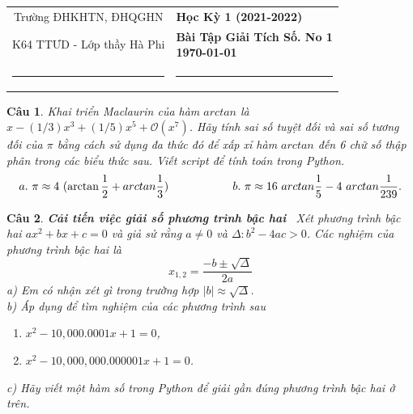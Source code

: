 \documentclass[answers]{exam}
\newtheorem{bt}{Câu}
\begin{document}
\begin{tabular*}
	{\linewidth}{c>{\centering\hspace{0pt}} p{}}
	Trường ĐHKHTN, ĐHQGHN & {\bf Học Kỳ 1 (2021-2022)}
	\tabularnewline
	{K64 TTƯD - Lớp thầy Hà Phi} & {\bf Bài Tập Giải Tích Số. No 1 \\ \today}
	\tabularnewline
	\rule{1in}{1pt}  \small  & \rule{2in}{1pt} %
	\tabularnewline
	
\end{tabular*}
%
\printanswers


\begin{bt}
	Khai triển Maclaurin của hàm $arctan$ là $x - (1/3)x^3 + (1/5)x^5 + \mathcal{O}(x^7)$. Hãy tính sai số tuyệt đối và sai số tương đối của $\pi$ bằng cách sử dụng đa thức đó để xấp xỉ hàm $arctan$ đến 6 chữ số thập phân trong các biểu thức sau. Viết script để tính toán trong Python.
	\begin{equation*} 
		a.\ \pi \approx 4 \ (\arctan \frac{1}{2} + arctan \frac{1}{3}) \hskip 2cm b.\ \pi \approx 16 \ arctan \frac{1}{5} - 4 \ arctan \frac{1}{239}.
	\end{equation*}
\end{bt}

\begin{bt} \textbf{Cải tiến việc giải số phương trình bậc hai} \ Xét phương trình bậc hai $ax^2 + bx+c = 0$ và giả sử rằng $a\not= 0$ và $\Delta : b^2-4ac>0$. Các nghiệm của phương trình bậc hai là
	\[
	x_{1,2} =  \dfrac{-b \pm \sqrt{\Delta}}{2a}
	\]
	a) Em có nhận xét gì trong trường hợp $|b| \approx \sqrt{\Delta}$. \\
	b) Áp dụng để tìm nghiệm của các phương trình sau
	\begin{enumerate}
		\item[i)] $x^2 - 10,000.0001 x + 1 = 0$, 
		\item[ii)] $x^2 - 10,000,000.000001 x + 1 = 0$.
	\end{enumerate}
	c) Hãy viết một hàm số trong Python để giải gần đúng phương trình bậc hai ở trên.
\end{bt}
\end{document}
